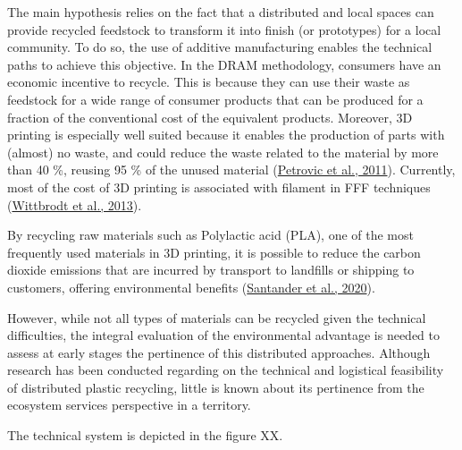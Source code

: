 \documentclass[]{elsarticle} %
\begin{document}
The main hypothesis relies on the fact that a distributed and local spaces can provide recycled feedstock to transform it into finish (or prototypes) for a local community.
To do so, the use of additive manufacturing enables the technical paths to achieve this objective.
In the DRAM methodology, consumers have an economic incentive to recycle.
This is because they can use their waste as feedstock for a wide range of consumer products that can be produced for a fraction of the conventional cost of the equivalent products.
Moreover, 3D printing is especially well suited because it enables the production of parts with (almost) no waste, and could reduce the waste related to the material by more than 40 \%, reusing 95 \% of the unused material (\protect\hyperlink{ref-Petrovic2011}{Petrovic et al., 2011}).
Currently, most of the cost of 3D printing is associated with filament in FFF techniques (\protect\hyperlink{ref-Wittbrodt2013}{Wittbrodt et al., 2013}).

By recycling raw materials such as Polylactic acid (PLA), one of the most frequently used materials in 3D printing, it is possible to reduce the carbon dioxide emissions that are incurred by transport to landfills or shipping to customers, offering environmental benefits (\protect\hyperlink{ref-Santander2020}{Santander et al., 2020}).

However, while not all types of materials can be recycled given the technical difficulties, the integral evaluation of the environmental advantage is needed to assess at early stages the pertinence of this distributed approaches.
Although research has been conducted regarding on the technical and logistical feasibility of distributed plastic recycling, little is known about its pertinence from the ecosystem services perspective in a territory.

The technical system is depicted in the figure XX.
\end{document}
